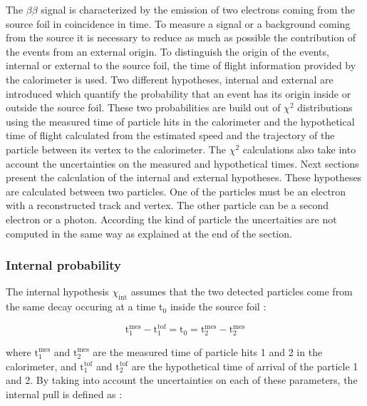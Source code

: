 \documentclass[main.tex]{subfiles}
\begin{document}
\NI The $\beta\beta$ signal is characterized by the emission of two electrons coming from the source foil in coincidence in time. To measure a signal or a background coming from the source it is necessary to reduce as much as possible the contribution of the events from an external origin. To distinguish the origin of the events, internal or external to the source foil, the time of flight information provided by the calorimeter is used. Two different hypotheses, internal and external are introduced which quantify the probability that an event has its origin inside or outside the source foil. These two probabilities are build out of $\chi^\text{2}$ distributions using the measured time of particle hits in the calorimeter and the hypothetical time of flight calculated from the estimated speed and the trajectory of the particle between its vertex to the calorimeter. The $\chi^\text{2}$ calculations also take into account the uncertainties on the measured and hypothetical times. Next sections present the calculation of the internal and external hypotheses. These hypotheses are calculated between two particles. One of the particles must be an electron with a reconstructed track and vertex.  The other particle can be a second electron or a photon. According the kind of particle the uncertaities are not computed in the same way as explained at the end of the section.


\subsubsection{Internal probability}\label{sec:Pint}


\NI The internal hypothesis $\chi_{\text{int}}$ assumes that the two detected particles come from the same decay occuring at a time t$_\text{0}$ inside the source foil :


\begin{equation}
\text{t}_\text{1}^{\text{mes}} - \text{t}_\text{1}^{\text{tof}} = \text{t}_\text{0} = \text{t}_\text{2}^{\text{mes}} - \text{t}_\text{2}^{\text{mes}}  
\end{equation}


\NI where $\text{t}_\text{1}^{\text{mes}}$ and $\text{t}_\text{2}^{\text{mes}}$ are the measured time of particle hits 1 and 2 in the calorimeter, and $\text{t}_\text{1}^{\text{tof}}$ and $\text{t}_\text{2}^{\text{tof}}$ are the hypothetical time of arrival of the particle 1 and 2. By taking into account the uncertainties on each of these parameters, the internal pull is defined as :
\end{document}
